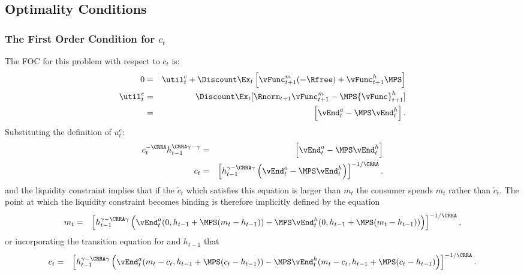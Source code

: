 \documentclass[titlepage]{\econtex}
\begin{document}
{\hypertarget{Optimality-Conditions}{}
\subsection{Optimality Conditions}
\hypertarget{The-First-Orrder-Condition-for-c}{}
\subsubsection{The First Order Condition for ${c}_{t}$}
The FOC for this problem with respect to ${c}_{t}$ is:
\begin{eqnarray}
   0 & = & \util^{c}_{t} + \Discount \Ex_{t} \left[{\vFunc}^{m}_{t+1}(-\Rfree)+{\vFunc}^{h}_{t+1} \MPS\right]  \\
   \util^{c}_{t} & = & \Discount \Ex_{t} [\Rnorm_{t+1} {\vFunc}_{t+1}^{m}-\MPS {\vFunc}_{t+1}^{h}] \label{eq:ctfoc}
\\           & = & \left[\vEnd_{t}^{{a}}-\MPS \vEnd_{t}^{h} \right].
\end{eqnarray}
Substituting the definition of $u_{t}^{c}$:
\begin{eqnarray}
    {c}_{t}^{-\CRRA}h_{t-1}^{\CRRA\gamma-\gamma} & = & \left[\vEnd_{t}^{{a}}-\MPS \vEnd_{t}^{h} \right]
\\  {c}_{t}                                    & = & \left[h_{t-1}^{\gamma-\CRRA\gamma} \left(\vEnd_{t}^{{a}}-\MPS \vEnd_{t}^{h} \right) \right]^{-1/\CRRA} \label{eq:habitsfoc}.
\end{eqnarray}
and the liquidity constraint implies that if the $\check{c}_{t}$ which
satisfies this equation is larger than ${m}_{t}$ the consumer spends
${m}_{t}$ rather than $\check{c}_{t}$.  The point at which the liquidity
constraint becomes binding is therefore implicitly defined by the equation
\begin{eqnarray}
  {m}_{t} & = & \left[h_{t-1}^{\gamma-\CRRA\gamma} \left(\vEnd_{t}^{{a}}(0,h_{t-1}+\MPS({m}_{t}-h_{t-1}))-\MPS \vEnd_{t}^{h}(0,h_{t-1}+\MPS({m}_{t}-h_{t-1}))\right)  \right]^{-1/\CRRA}, \label{eq:LCbindsHabits}
\end{eqnarray}
or incorporating the transition equation for
and $h_{t-1}$ that
\begin{eqnarray}
  {c}_{t} & = & \left[h_{t-1}^{\gamma-\CRRA\gamma}
  \left(\vEnd_{t}^{{a}}({m}_{t}-{c}_{t},h_{t-1}+\MPS({c}_{t}-h_{t-1}))
  -\MPS \vEnd_{t}^{h}({m}_{t}-{c}_{t},h_{t-1}+\MPS({c}_{t}-h_{t-1})\right)
  \right]^{-1/\CRRA}. \nonumber
\end{eqnarray}

}
\end{document}
